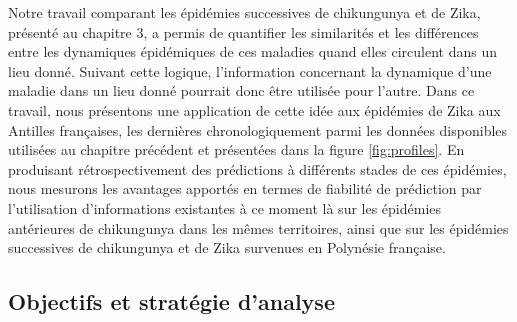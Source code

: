 Notre travail comparant les épidémies successives de chikungunya et de Zika, présenté au chapitre 3, a permis de quantifier les similarités et les différences entre les dynamiques épidémiques de ces maladies quand elles circulent dans un lieu donné.
Suivant cette logique, l'information concernant la dynamique d'une maladie dans un lieu donné pourrait donc être utilisée pour l'autre.
Dans ce travail, nous présentons une application de cette idée aux épidémies de Zika aux Antilles françaises, les dernières chronologiquement parmi les données disponibles utilisées au chapitre précédent et présentées dans la figure \ref{fig:profiles}.
En produisant rétrospectivement des prédictions à différents stades de ces épidémies, nous mesurons les avantages apportés en termes de fiabilité de prédiction par l'utilisation d'informations existantes à ce moment là sur les épidémies antérieures de chikungunya dans les mêmes territoires, ainsi que sur les épidémies successives de chikungunya et de Zika survenues en Polynésie française.

\subsection{Objectifs et stratégie d'analyse}

